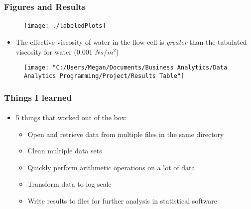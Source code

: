 \documentclass[mathserif]{beamer}
\begin{document}
  \begin{frame}
      \frametitle{Figures and Results}
      \framesubtitle{}
      
      \begin{figure}
		  \centering
		  \texttt{[image: ./labeledPlots]}
		  \vspace{-3mm}
	  	  \label{fig:0}
	  \end{figure}

	  \vspace{-6mm}
	  \begin{itemize}
	  \item The effective viscosity of water in the flow cell is \emph{greater} than the tabulated viscosity for water (0.001 $Ns/m^2$)
	  \end{itemize}

      \begin{figure}
		\centering
		\texttt{[image: "C:/Users/Megan/Documents/Business Analytics/Data Analytics Programming/Project/Results Table"]}
		\label{fig:ResultsTable}
	  \end{figure}
  \end{frame}
  
  \begin{frame}
      \frametitle{Things I learned}
      \framesubtitle{}
      \begin{itemize}
      \item 5 things that worked out of the box:
      	\begin{itemize} 
      	\item Open and retrieve data from multiple files in the same directory
      	\item Clean multiple data sets
      	\item Quickly perform arithmetic operations on a lot of data
      	\item Transform data to log scale
      	\item Write results to files for further analysis in statistical software
      	\end{itemize}
      	
      		 
	\end{itemize}
    \end{frame}
    
\end{document}
